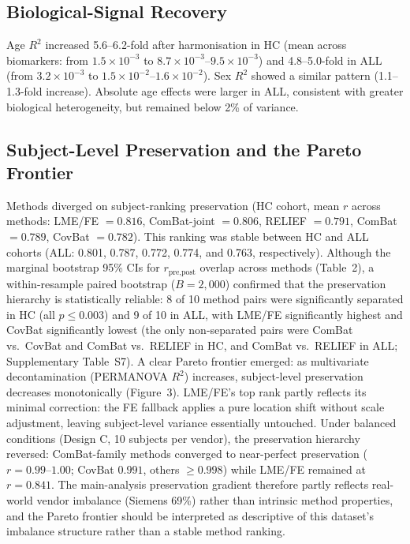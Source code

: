 \documentclass[12pt,a4paper]{article}
\begin{document}
\subsection{Biological-Signal Recovery}

Age $R^2$ increased 5.6--6.2-fold after harmonisation in HC (mean across biomarkers: from $1.5\times10^{-3}$ to $8.7\times10^{-3}$--$9.5\times10^{-3}$) and 4.8--5.0-fold in ALL (from $3.2\times10^{-3}$ to $1.5\times10^{-2}$--$1.6\times10^{-2}$). Sex $R^2$ showed a similar pattern (1.1--1.3-fold increase). Absolute age effects were larger in ALL, consistent with greater biological heterogeneity, but remained below 2\% of variance.

\subsection{Subject-Level Preservation and the Pareto Frontier}

Methods diverged on subject-ranking preservation (HC cohort, mean $r$ across methods: LME/FE $=0.816$, ComBat-joint $=0.806$, RELIEF $=0.791$, ComBat $=0.789$, CovBat $=0.782$). This ranking was stable between HC and ALL cohorts (ALL: 0.801, 0.787, 0.772, 0.774, and 0.763, respectively). Although the marginal bootstrap 95\% CIs for $r_{\text{pre,post}}$ overlap across methods (Table~2), a within-resample paired bootstrap ($B=2{,}000$) confirmed that the preservation hierarchy is statistically reliable: 8 of 10 method pairs were significantly separated in HC (all $p\leq0.003$) and 9 of 10 in ALL, with LME/FE significantly highest and CovBat significantly lowest (the only non-separated pairs were ComBat vs.\ CovBat and ComBat vs.\ RELIEF in HC, and ComBat vs.\ RELIEF in ALL; Supplementary Table~S7). A clear Pareto frontier emerged: as multivariate decontamination (PERMANOVA $R^2$) increases, subject-level preservation decreases monotonically (Figure~3). LME/FE's top rank partly reflects its minimal correction: the FE fallback applies a pure location shift without scale adjustment, leaving subject-level variance essentially untouched. Under balanced conditions (Design C, 10 subjects per vendor), the preservation hierarchy reversed: ComBat-family methods converged to near-perfect preservation ($r=0.99$--$1.00$; CovBat $0.991$, others $\geq0.998$) while LME/FE remained at $r=0.841$. The main-analysis preservation gradient therefore partly reflects real-world vendor imbalance (Siemens 69\%) rather than intrinsic method properties, and the Pareto frontier should be interpreted as descriptive of this dataset's imbalance structure rather than a stable method ranking.
\end{document}
